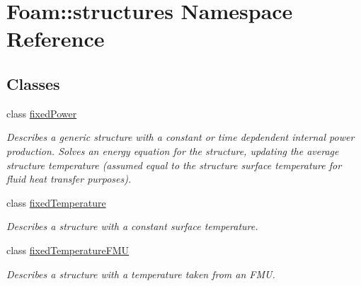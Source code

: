 \hypertarget{namespaceFoam_1_1structures}{}\section{Foam\+:\+:structures Namespace Reference}
\label{namespaceFoam_1_1structures}
\subsection*{Classes}
\begin{DoxyCompactItemize}
\item 
class \hyperlink{classFoam_1_1structures_1_1fixedPower}{fixed\+Power}
\begin{DoxyCompactList}\small\item\em Describes a generic structure with a constant or time depdendent internal power production. Solves an energy equation for the structure, updating the average structure temperature (assumed equal to the structure surface temperature for fluid heat transfer purposes). \end{DoxyCompactList}\item 
class \hyperlink{classFoam_1_1structures_1_1fixedTemperature}{fixed\+Temperature}
\begin{DoxyCompactList}\small\item\em Describes a structure with a constant surface temperature. \end{DoxyCompactList}\item 
class \hyperlink{classFoam_1_1structures_1_1fixedTemperatureFMU}{fixed\+Temperature\+F\+MU}
\begin{DoxyCompactList}\small\item\em Describes a structure with a temperature taken from an F\+MU. \end{DoxyCompactList}\end{DoxyCompactItemize}
